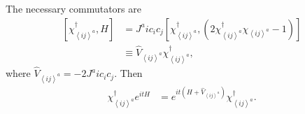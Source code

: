 \documentclass[aps,pra,preprint,groupedaddress]{revtex4-1}
\newcommand{\1}{\mathds{1}}
\begin{document}
The necessary commutators are
\begin{align}
\left[\chi^\dagger_{\left<ij\right>^a}, H \right] &= J^a i c_i c_j \left[\chi^\dagger_{\left<ij\right>^a}, \left(2\chi^\dagger_{\left<ij\right>^a} \chi_{\left<ij\right>^a} - 1\right) \right] \nonumber \\
&\equiv \hat{V}_{\left<ij\right>^a} \chi^\dagger_{\left<ij\right>^a},
\end{align}
where $\hat{V}_{\left<ij\right>^a} = -2J^a ic_i c_j$.
Then
\begin{align}
\chi^\dagger_{\left<ij\right>^a} e^{itH} &= e^{it\left( H + \hat{V}_{\left<ij\right>^a}\right) } \chi^\dagger_{\left<ij\right>^a}. \label{identity}
\end{align}
\end{document}
